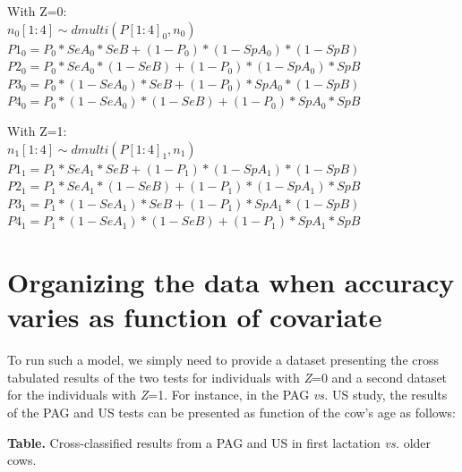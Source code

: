 \documentclass[
]{book}
\begin{document}
With Z=0:\\
\(n_0[1:4] \sim dmulti(P[1:4]_0, n_0)\)\\
\(P1_0 = P_0*SeA_0*SeB + (1-P_0)*(1-SpA_0)*(1-SpB)\)\\
\(P2_0 = P_0*SeA_0*(1-SeB) + (1-P_0)*(1-SpA_0)*SpB\)\\
\(P3_0 = P_0*(1-SeA_0)*SeB + (1-P_0)*SpA_0*(1-SpB)\)\\
\(P4_0 = P_0*(1-SeA_0)*(1-SeB) + (1-P_0)*SpA_0*SpB\)

With Z=1:\\
\(n_1[1:4] \sim dmulti(P[1:4]_1, n_1)\)\\
\(P1_1 = P_1*SeA_1*SeB + (1-P_1)*(1-SpA_1)*(1-SpB)\)\\
\(P2_1 = P_1*SeA_1*(1-SeB) + (1-P_1)*(1-SpA_1)*SpB\)\\
\(P3_1 = P_1*(1-SeA_1)*SeB + (1-P_1)*SpA_1*(1-SpB)\)\\
\(P4_1 = P_1*(1-SeA_1)*(1-SeB) + (1-P_1)*SpA_1*SpB\)

\section{Organizing the data when accuracy varies as function of covariate}\label{organizing-the-data-when-accuracy-varies-as-function-of-covariate}

To run such a model, we simply need to provide a dataset presenting the cross tabulated results of the two tests for individuals with \emph{Z}=0 and a second dataset for the individuals with \emph{Z}=1. For instance, in the PAG \emph{vs.} US study, the results of the PAG and US tests can be presented as function of the cow's age as follows:

\textbf{Table.} Cross-classified results from a PAG and US in first lactation \emph{vs.} older cows.
\end{document}
